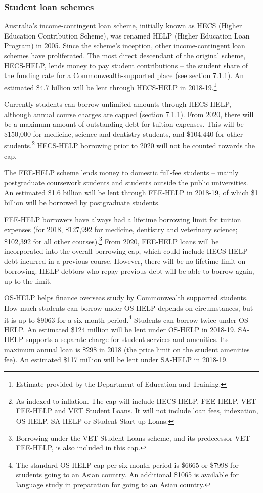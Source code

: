 \documentclass[]{book}
\begin{document}
\hypertarget{student-loan-schemes}{%
\subsubsection{Student loan schemes}\label{student-loan-schemes}}

Australia's income-contingent loan scheme, initially known as HECS (Higher Education Contribution Scheme), was renamed HELP (Higher Education Loan Program) in 2005. Since the scheme's inception, other income-contingent loan schemes have proliferated. The most direct descendant of the original scheme, HECS-HELP, lends money to pay student contributions -- the student share of the funding rate for a Commonwealth-supported place (see section 7.1.1). An estimated \$4.7 billion will be lent through HECS-HELP in 2018-19.\footnote{Estimate provided by the Department of Education and Training.}

Currently students can borrow unlimited amounts through HECS-HELP, although annual course charges are capped (section 7.1.1). From 2020, there will be a maximum amount of outstanding debt for tuition expenses. This will be \$150,000 for medicine, science and dentistry students, and \$104,440 for other students.\footnote{As indexed to inflation. The cap will include HECS-HELP, FEE-HELP, VET FEE-HELP and VET Student Loans. It will not include loan fees, indexation, OS-HELP, SA-HELP or Student Start-up Loans.} HECS-HELP borrowing prior to 2020 will not be counted towards the cap.

The FEE-HELP scheme lends money to domestic full-fee students -- mainly postgraduate coursework students and students outside the public universities. An estimated \$1.6 billion will be lent through FEE-HELP in 2018-19, of which \$1 billion will be borrowed by postgraduate students.

FEE-HELP borrowers have always had a lifetime borrowing limit for tuition expenses (for 2018, \$127,992 for medicine, dentistry and veterinary science; \$102,392 for all other courses).\footnote{Borrowing under the VET Student Loans scheme, and its predecessor VET FEE-HELP, is also included in this cap.} From 2020, FEE-HELP loans will be incorporated into the overall borrowing cap, which could include HECS-HELP debt incurred in a previous course. However, there will be no lifetime limit on borrowing. HELP debtors who repay previous debt will be able to borrow again, up to the limit.

OS-HELP helps finance overseas study by Commonwealth supported students. How much students can borrow under OS-HELP depends on circumstances, but it is up to \$9063 for a six-month period.\footnote{The standard OS-HELP cap per six-month period is \$6665 or \$7998 for students going to an Asian country. An additional \$1065 is available for language study in preparation for going to an Asian country.} Students can borrow twice under OS-HELP. An estimated \$124 million will be lent under OS-HELP in 2018-19. SA-HELP supports a separate charge for student services and amenities. Its maximum annual loan is \$298 in 2018 (the price limit on the student amenities fee). An estimated \$117 million will be lent under SA-HELP in 2018-19.
\end{document}
